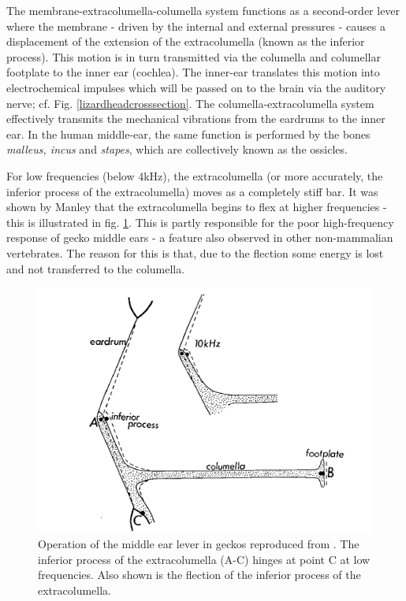 The membrane-extracolumella-columella system functions
as a second-order lever where the membrane - driven by the internal and external pressures - causes a displacement
of the extension of the extracolumella (known as the inferior process). This motion is in turn transmitted 
via the columella and columellar footplate to the inner ear (cochlea). The inner-ear translates this motion into
electrochemical impulses which will be passed on to the brain via the auditory nerve; cf. Fig. \ref{lizardheadcrosssection}. The columella-extracolumella system effectively
transmits the mechanical vibrations from the eardrums to the inner ear. 
In the human middle-ear, the same function is
performed by the bones \textit{malleus, incus} and \textit{stapes}, which are collectively known
as the ossicles. 

For low frequencies (below $4$kHz), the extracolumella (or more accurately, the inferior process of the extracolumella)
moves as a completely stiff bar. It was shown by Manley \cite{manleygecko2} that the extracolumella begins to flex at higher frequencies - 
this is illustrated in fig. \ref{extracolumellaflection}. This is partly responsible for the poor high-frequency response of gecko middle ears - 
a feature also observed in other non-mammalian vertebrates. The reason for this is that, due to the flection some energy is lost and
not transferred to the columella.

\begin{figure}[ht]
 \centering
 \includegraphics[width=.7\linewidth]{Diagrams/manleyextracolumellaflection.png}
 \caption[Extracolumella Flection]{Operation of the middle ear lever in geckos reproduced from \cite{manleygecko2}. The inferior process of the extracolumella (A-C) 
 hinges at point C at low frequencies. Also shown is the flection of the inferior process of the extracolumella.}
 \label{extracolumellaflection}
\end{figure}

